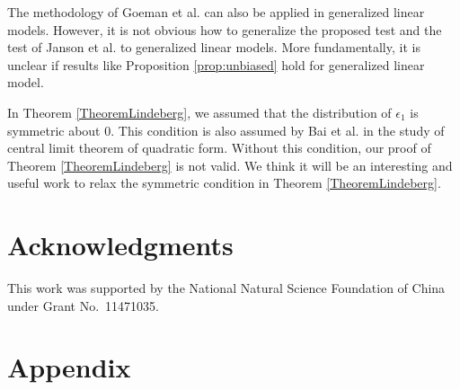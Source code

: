 \documentclass[bj]{imsart}
\theoremstyle{plain}
\theoremstyle{definition}
\theoremstyle{remark}
\begin{document}
The methodology of Goeman {\rm et al.} \cite{Goeman2006} can also be applied in generalized linear models.
However, it is not obvious how to generalize the proposed test and the test of Janson {\rm et al.} \cite{Janson2016} to generalized linear models.
More fundamentally, it is unclear if results like Proposition \ref{prop:unbiased} hold for generalized linear model.

In Theorem \ref{TheoremLindeberg}, we assumed that the distribution of $\epsilon_1$ is symmetric about $0$. 
This condition is also assumed by Bai {\rm et al.} \cite{Bai2017} in the study of central limit theorem of quadratic form.
Without this condition, our proof of Theorem \ref{TheoremLindeberg} is not valid.
We think it will be an interesting and useful work to relax the symmetric condition in Theorem \ref{TheoremLindeberg}.





\section*{Acknowledgments}
This work was supported by the National Natural Science Foundation of China under Grant No.\ 11471035.





\appendix
\section*{Appendix}
\end{document}
